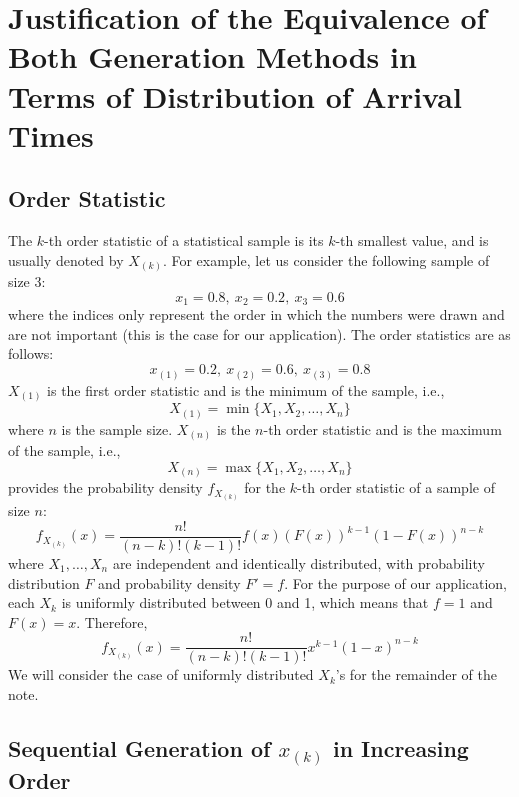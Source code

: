 \documentclass[12pt]{article} %
\begin{document}
\section{Justification of the Equivalence of Both Generation Methods in Terms of Distribution of Arrival Times}\label{sec:justification}
%
%
%
\subsection{Order Statistic}
%
The $k$-th order statistic of a statistical sample is its $k$-th smallest value, and is usually denoted by  $X_{(k)}$. For example, let us consider the following sample of size 3:
\[
x_1=0.8,\ x_2=0.2,\ x_3=0.6
\]
where the indices only represent the order in which the numbers were drawn and are not important (this is the case for our application). The order statistics are as follows:
\[
x_{(1)}=0.2,\ x_{(2)}=0.6,\ x_{(3)}=0.8
\]
$X_{(1)}$ is the first order statistic and is the minimum of the sample, i.e.,
\[
X_{(1)}=\min\{X_1,X_2,\ldots,X_n\}
\]
where $n$ is the sample size. $X_{(n)}$ is the $n$-th order statistic and is the maximum of the sample, i.e.,
\[
X_{(n)}=\max\{X_1,X_2,\ldots,X_n\}
\]
\citet{00ross} provides the probability density $f_{X_{(k)}}$ for the $k$-th order statistic of a sample of size $n$:
\begin{equation}
f_{X_{(k)}}(x) = \frac{n!}{(n-k)!(k-1)!}f(x)\left(F(x)\right)^{k-1}\left(1-F(x)\right)^{n-k}
\end{equation}
where $X_1,\ldots,X_n$ are independent and identically distributed, with probability distribution $F$ and probability density $F'=f$. For the purpose of our application, each $X_k$ is uniformly distributed between 0 and 1, which means that $f=1$ and $F(x)=x$. Therefore,
\begin{equation}\label{eq:densityOrder}
f_{X_{(k)}}(x) = \frac{n!}{(n-k)!(k-1)!}x^{k-1}(1-x)^{n-k}
\end{equation}
We will consider the case of uniformly distributed $X_k$'s for the remainder of the note.
%
%
\subsection{Sequential Generation of $x_{(k)}$ in Increasing Order}\label{sec:proof}
%
%
%
\end{document}
